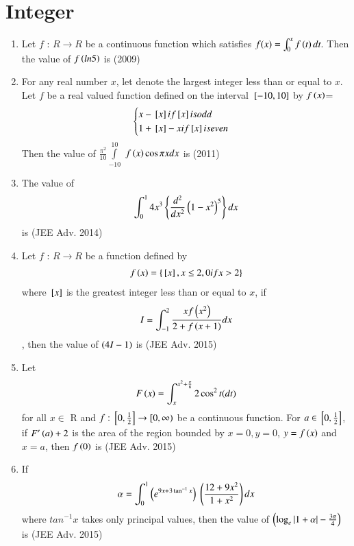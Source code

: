 \documentclass[journal,12pt,onecolumn]{IEEEtran}
\theoremstyle{remark}
\begin{document}
\section{Integer}
\begin{enumerate}

\item Let $f$ : $R\rightarrow R$ be a continuous function which 
 satisfies $f(x)=\int_{0}^{x}f\left(t\right)dt.$ Then the value of $f\left(ln5\right)$ is \hfill{(2009)}
  
         \item For any real number $x$, let  denote the largest integer less than or equal to $x$. Let $f$ be a real valued function defined on the interval ${}\left[-10,10\right]$ by
		 $f\left(x\right)$= \[\begin{cases}  x-{}\left[x\right] if {}\left[x\right] is odd \\ 1+{}\left[x\right]-x if {}\left[x\right] is even \end{cases}\]
  Then the value of $\frac{{\pi}^{2}}{10}\int\limits_{-10}^{10}$ $f\left(x\right)\cos\pi xdx$ is \hfill{(2011)}


         \item The value of 
		 \begin{align}
			 \int_{0}^{1} 4x^3 \left\{\frac{d^2}{dx^2}\left(1-x^2\right)^5 \right\}dx 
		 \end{align}
		 is \hfill{(JEE Adv. 2014)}

  \item Let $f$ : $R \rightarrow R$ be a function defined by
	  \begin{align}
		  f\left(x\right)=\left\{{}\left[x\right],x \leq2, 0 if x>2 \right\}
	  \end{align}
  where ${}\left[x\right]$ is the greatest integer less than or equal to $x$, if 
  \[ I=\int_{-1}^{2} \frac{xf\left(x^2\right)}{2+f\left(x+1\right)}dx \],
		then the value of $\left(4I-1\right)$ is \hfill{(JEE Adv. 2015)}  

\item Let 
	\begin{align}
		F\left(x\right)=\int_{x}^{x^2 +\frac{\pi}{6}} 2\cos^2t(dt)
	\end{align}
 for all $x \in$ R and $f:{}\left[0,\frac{1}{2}\right]\rightarrow[0,\infty)$ be a continuous function. For $a \in{}\left[0,\frac{1}{2}\right]$, if $F^\prime\left(a\right)+2$ is the area of the region bounded by $x=0, y=0$, $y=f\left(x\right)$ and $x=a$, then $f\left(0\right)$ is   \hfill{(JEE Adv. 2015)}

\item If 
	\begin{align}
		\alpha=\int_{0}^{1}\left(e^{9x+3\tan^{-1}x} \right) \ \left( \frac{12+9x^2}{1+x^2}\right)dx
	\end{align}
		where $tan^{-1}x$ takes only principal values,
 then the value of $\left(\log_e |1+\alpha|-\frac{3\pi}{4}\right)$ is  \hfill{(JEE Adv. 2015)} 
\end{enumerate}
\end{document}
